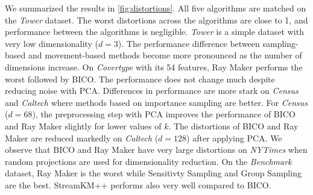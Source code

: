 We summarized the results in \cref{fig:distortions}.
All five algorithms are matched on the \textit{Tower} dataset. The worst distortions across the algorithms are close to 1, and performance between the algorithms is negligible. \textit{Tower} is a simple dataset with very low dimensionality ($d=3$). The performance difference between sampling-based and movement-based methods become more pronounced as the number of dimensions increase. On \textit{Covertype} with its 54 features, Ray Maker performs the worst followed by BICO. The performance does not change much despite reducing noise with PCA. Differences in performance are more stark on \textit{Census} and \textit{Caltech} where methods based on importance sampling are better. For \textit{Census} ($d=68$), the preprocessing step with PCA improves the performance of BICO and Ray Maker slightly for lower values of $k$. The distortions of BICO and Ray Maker are reduced markedly on \textit{Caltech} ($d=128$) after applying PCA. We observe that BICO and Ray Maker have very large distortions on \textit{NYTimes} when random projections are used for dimensionality reduction. On the \textit{Benchmark} dataset, Ray Maker is the worst while Sensitivty Sampling and Group Sampling are the best. StreamKM++ performs also very well compared to BICO.
